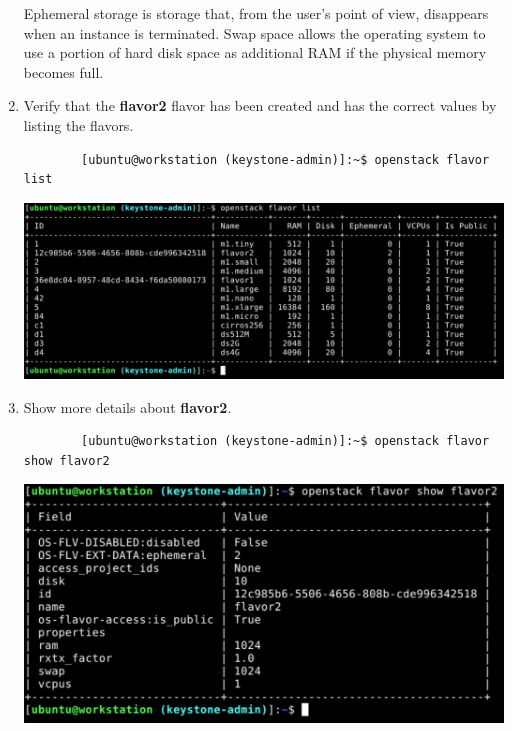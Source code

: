 \documentclass[letterpaper, 12pt]{article}
\begin{document}
\begin{enumerate}
    \begin{notebox}
        Ephemeral storage is storage that, from the user's point of view, disappears when an instance is terminated.
        Swap space allows the operating system to use a portion of hard disk space as additional RAM if the physical memory becomes full.
    \end{notebox}

    \item Verify that the \textbf{flavor2} flavor has been created and has the correct values by listing the flavors.
    \begin{lstlisting}
        [ubuntu@workstation (keystone-admin)]:~$ openstack flavor list
    \end{lstlisting}

    \begin{center}
        \includegraphics[width=\linewidth]{images/part2/step9.png}
    \end{center}

    \item Show more details about \textbf{flavor2}.
    \begin{lstlisting}
        [ubuntu@workstation (keystone-admin)]:~$ openstack flavor show flavor2
    \end{lstlisting}

    \begin{center}
        \includegraphics[width=\linewidth]{images/part2/step10.png}
    \end{center}


\end{enumerate}
\end{document}
